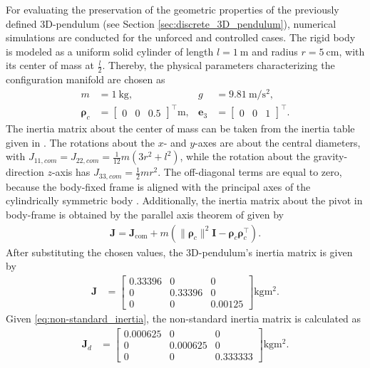 For evaluating the preservation of the geometric properties of the previously 
defined 3D-pendulum (see Section \ref{sec:discrete_3D_pendulum}), 
numerical simulations are conducted for the unforced and controlled cases. The rigid body is modeled as a uniform solid cylinder of length $l=\SI{1}{\meter}$ and radius $r=\SI{5}{\cm}$, with its center of mass at $\frac{l}{2}$. Thereby, the physical parameters characterizing the configuration manifold are chosen as 
\begin{align}
    m &= \SI{1}{\kilogram}, &
    g &= \SI{9.81}{\meter\per\second\squared}, \\
    \bm{\rho}_c &=
    \begin{bmatrix}
        0 & 0 & 0.5
    \end{bmatrix}^\top \si{\meter}, &
    \bm{e}_3 &=
    \begin{bmatrix}
        0 & 0 & 1
    \end{bmatrix}^\top.
\end{align}
 The inertia matrix about the center of mass can be taken from the inertia table given in \cite{RITInertiaTable216}. The rotations about the $x$- and $y$-axes are about the central diameters, with $J_{11,com}=J_{22,com}= \frac{1}{12}m(3r^2 + l^2)$, while the rotation about the gravity-direction $z$-axis has $J_{33,com}=\frac{1}{2} mr^2$. The off-diagonal terms are equal to zero, because the body-fixed frame is aligned with the principal axes of the cylindrically symmetric body \cite{Lee2008}. Additionally, the inertia matrix about the pivot in body-frame is obtained by the parallel axis theorem of \cite{Benacquista2018ClassicalMechanics} given by
\begin{align}
    \bm{J}
    =
    \bm{J}_{\mathrm{com}}
    +
    m\left(
        \|\bm{\rho}_c\|^2\bm{I}
        -
        \bm{\rho}_c\bm{\rho}_c^{\top}
    \right).
\end{align}
After substituting the chosen values, the 3D-pendulum's inertia matrix is given by
\begin{align}
    \bm{J}
    &=
    \begin{bmatrix}
        0.33396 & 0 & 0 \\
        0 & 0.33396 & 0 \\
        0 & 0 & 0.00125
    \end{bmatrix}
    \si{\kilogram\meter\squared}.
\end{align}
Given \eqref{eq:non-standard_inertia}, the non-standard inertia matrix is calculated as
\begin{align}
    \bm{J}_d
    &=
    \begin{bmatrix}
        0.000625 & 0 & 0 \\
        0 & 0.000625 & 0 \\
        0 & 0 & 0.333333
    \end{bmatrix}
    \si{\kilogram\meter\squared}.
\end{align}
